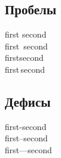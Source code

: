 \subsection{Пробелы}

\noindent
first second\\
first~second\\ %
first\:second\\
first\,second\\
\subsection{Дефисы}

\noindent
first-second\\
first--second\\
first---second
